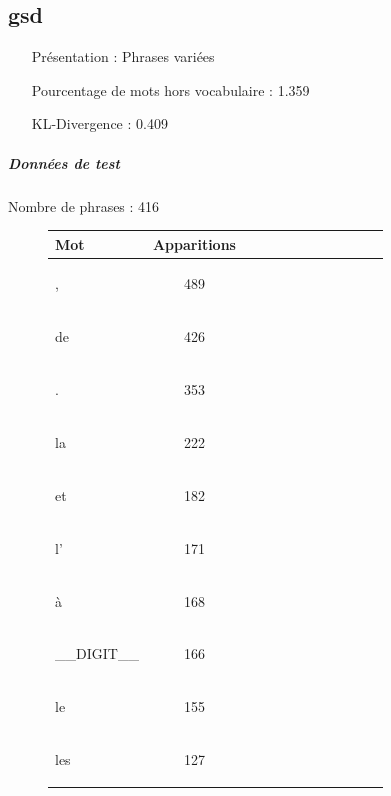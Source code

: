 \clearpage \subsection{gsd } 
 \begin{itemize} 
 \item[Présentation :] Phrases variées

 \item[Pourcentage de mots hors vocabulaire : ]1.359
 \item[KL-Divergence :]0.409
 \end{itemize}  \subparagraph{Données de test \\ }  
 Nombre de phrases : 416\\ 
\begin{figure}[H] \begin{minipage}{0.48\textwidth} \centering \begin{tabular}{|l || *{11 }{|c} |} \hline
Mot & Apparitions  \\ \hline
\begin{verb} , \end{verb} &489\\ \hline
\begin{verb} de \end{verb} &426\\ \hline
\begin{verb} . \end{verb} &353\\ \hline
\begin{verb} la \end{verb} &222\\ \hline
\begin{verb} et \end{verb} &182\\ \hline
\begin{verb} l' \end{verb} &171\\ \hline
\begin{verb} à \end{verb} &168\\ \hline
\begin{verb} __DIGIT__ \end{verb} &166\\ \hline
\begin{verb} le \end{verb} &155\\ \hline
\begin{verb} les \end{verb} &127\\ \hline


\end{tabular}
\end{minipage}
\end{figure}
